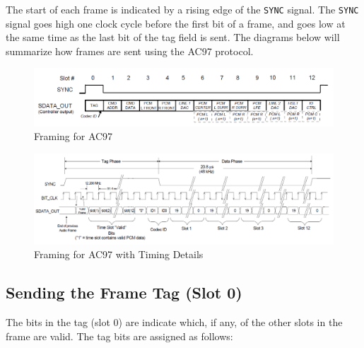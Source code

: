 \documentclass[11pt]{article}
\begin{document}
The start of each frame is indicated by a rising edge of the \verb|SYNC| signal. The \verb|SYNC| signal goes high one clock cycle before the first bit of a frame, and goes low at the same time as the last bit of the tag field is sent. The diagrams below will summarize how frames are sent using the AC97 protocol.

\begin{figure}[hbt]
	\begin{center}
		\includegraphics[width=6in]{ac97_framing}
		\caption{Framing for AC97}
	\end{center}
\end{figure}

\begin{figure}[hbt]
	\begin{center}
		\includegraphics[width=6in]{ac97_framing_detail}
		\caption{Framing for AC97 with Timing Details}
	\end{center}
\end{figure}

\subsection{Sending the Frame Tag (Slot 0)}

The bits in the tag (slot 0) are indicate which, if any, of the other slots in the frame are valid. The tag bits are assigned as follows:
\end{document}
